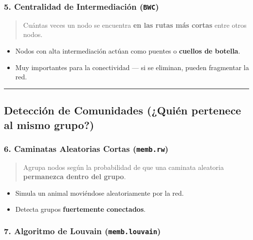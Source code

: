 \documentclass[
]{book}
\providecommand{\tightlist}{%
  \setlength{\itemsep}{0pt}\setlength{\parskip}{0pt}}
\begin{document}
\subsubsection{\texorpdfstring{5. Centralidad de Intermediación (\texttt{BWC})}{5. Centralidad de Intermediación (BWC)}}\label{centralidad-de-intermediaciuxf3n-bwc}

\begin{quote}
Cuántas veces un nodo se encuentra \textbf{en las rutas más cortas} entre otros nodos.
\end{quote}

\begin{itemize}
\tightlist
\item
  Nodos con alta intermediación actúan como puentes o \textbf{cuellos de botella}.
\item
  Muy importantes para la conectividad --- si se eliminan, pueden fragmentar la red.
\end{itemize}

\begin{center}\rule{0.5\linewidth}{0.5pt}\end{center}

\subsection{Detección de Comunidades (¿Quién pertenece al mismo grupo?)}\label{detecciuxf3n-de-comunidades-quiuxe9n-pertenece-al-mismo-grupo}

\subsubsection{\texorpdfstring{6. Caminatas Aleatorias Cortas (\texttt{memb.rw})}{6. Caminatas Aleatorias Cortas (memb.rw)}}\label{caminatas-aleatorias-cortas-memb.rw}

\begin{quote}
Agrupa nodos según la probabilidad de que una caminata aleatoria \textbf{permanezca dentro del grupo}.
\end{quote}

\begin{itemize}
\tightlist
\item
  Simula un animal moviéndose aleatoriamente por la red.
\item
  Detecta grupos \textbf{fuertemente conectados}.
\end{itemize}

\subsubsection{\texorpdfstring{7. Algoritmo de Louvain (\texttt{memb.louvain})}{7. Algoritmo de Louvain (memb.louvain)}}\label{algoritmo-de-louvain-memb.louvain}
\end{document}
